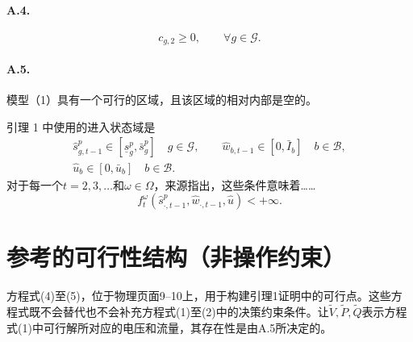 \documentclass[10pt]{article}
\begin{document}
\paragraph{A.4.}
\begin{equation}
c_{g,2}\geq0,\qquad\forall g\in\mathcal G.\tag{A.4}
\end{equation}
\paragraph{A.5.}
模型（1）具有一个可行的区域，且该区域的相对内部是空的。

引理 1 中使用的进入状态域是
\begin{equation}
\begin{gathered}
\hat s_{g,t-1}^p\in[\underline s_g^p,\bar s_g^p]\quad g\in\mathcal G,\qquad
\hat w_{b,t-1}\in[0,\bar I_b]\quad b\in\mathcal B,\\
\hat u_b\in[0,\bar u_b]\quad b\in\mathcal B.
\end{gathered}\tag{3}
\end{equation}
对于每一个$t=2,3,\ldots$和$\omega\in\Omega$，来源指出，这些条件意味着……
\[
f_t^\omega(\hat s_{\cdot,t-1}^p,\hat w_{\cdot,t-1},\hat u)<+\infty.
\]

\section*{参考的可行性结构（非操作约束）}
方程式(4)至(5)，位于物理页面9–10上，用于构建引理1证明中的可行点。这些方程式既不会替代也不会补充方程式(1)至(2)中的决策约束条件。让$\widetilde V,\widetilde P,\widetilde Q$表示方程式(1)中可行解所对应的电压和流量，其存在性是由A.5所决定的。
\end{document}
